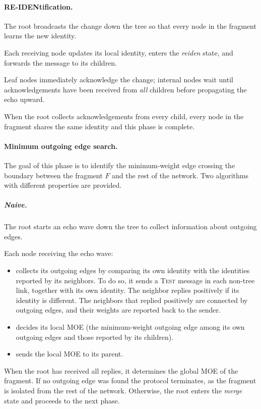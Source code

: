 \documentclass{memoir}
\begin{document}
\paragraph{RE-IDENtification.}

The root broadcasts the change down the tree so that every node in the fragment learns the
new identity.

Each receiving node updates its local identity, enters the \emph{reiden} state, and
forwards the message to its children.

Leaf nodes immediately acknowledge the change; internal nodes wait until acknowledgements
have been received from \emph{all} children before propagating the echo upward.

When the root collects acknowledgements from every child, every node in the fragment
shares the same identity and this phase is complete.

\paragraph{Minimum outgoing edge search.}

The goal of this phase is to identify the minimum-weight edge crossing the boundary
between the fragment $F$ and the rest of the network.
Two algorithms with different properties are provided.

\subparagraph{Naive.}

The root starts an echo wave down the tree to collect information about outgoing edges.

Each node receiving the echo wave:
\begin{itemize}
\item collects its outgoing edges by comparing its own identity with the identities
reported by its neighbors. To do so, it sends a \textsc{Test} message in each non-tree
link, together with its own identity. The neighbor replies positively if its identity is
different. The neighbors that replied positively are connected by outgoing edges, and
their weights are reported back to the sender.
\item decides its local MOE (the minimum-weight outgoing edge among its own outgoing edges
and those reported by its children).
\item sends the local MOE to its parent.
\end{itemize}

When the root has received all replies, it determines the global MOE of the fragment. If
no outgoing edge was found the protocol terminates, as the fragment is isolated from the
rest of the network. Otherwise, the root enters the \emph{merge} state and proceeds to the
next phase.
\end{document}
